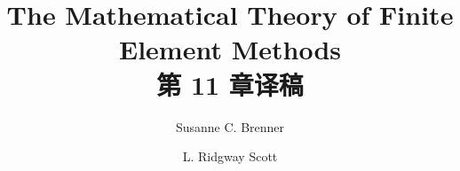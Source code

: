 \documentclass[a4paper,UTF8,12pt]{ctexart}
\title{The Mathematical Theory of Finite Element Methods\\第 11 章译稿}
\author{Susanne C. Brenner \and L. Ridgway Scott}
\date{}
\begin{document}
\maketitle
\setcounter{section}{10}
\renewcommand{\thethmcount}{\thesubsection.\arabic{thmcount}}
\renewcommand{\theequation}{\thesubsection.\arabic{equation}}
\renewcommand{\thefigure}{\thesection.\arabic{figure}}
\renewcommand{\thetable}{\thesection.\arabic{table}}

\end{document}
